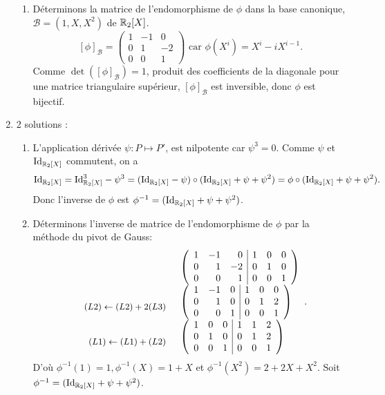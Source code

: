 \documentclass{book}
\begin{document}
\begin{enumerate}
\begin{enumerate}
\item  Déterminons la matrice de l'endomorphisme de $\phi$ dans la base canonique, $\mathcal{B}=(1,X,X^2)$ de $\mathbb{R} _2[X]$.
$$[\phi]_{\mathcal{B}}=\begin{pmatrix}1 &-1&0\\0 &1&-2\\0&0&1 \end{pmatrix}\text{ car } \phi(X^i)=X^i-i  X^{i-1}.$$
Comme $\det ([\phi]_{\mathcal{B}})=1$, produit des coefficients de la diagonale pour une matrice triangulaire supérieur,  $[\phi]_{\mathcal{B}}$ est inversible, donc $\phi$ est bijectif.  
\end{enumerate}
\item 2 solutions :
\begin{enumerate}
\item L'application dérivée $\psi:P\mapsto P'$, est nilpotente car $\psi^3=0$. Comme $\psi$ et $\mathrm{Id}_{\mathbb{R} _2[X]}$ commutent,
on a$$ \mathrm{Id}_{\mathbb{R} _2[X]}=\mathrm{Id}^3_{\mathbb{R} _2[X]}-\psi^3=(\mathrm{Id}_{\mathbb{R} _2[X]}-\psi)\circ(\mathrm{Id}_{\mathbb{R} _2[X]}+\psi+\psi^2)=\phi\circ (\mathrm{Id}_{\mathbb{R} _2[X]}+\psi+\psi^2).$$ Donc l'inverse de $\phi$ est $\phi^{-1}=(\mathrm{Id}_{\mathbb{R} _2[X]}+\psi+\psi^2)$.
\item  Déterminons l'inverse de matrice de l'endomorphisme de $\phi$ par la méthode du pivot de Gauss:
$$\begin{array}{rl}
&\left({\begin{array}{rrr|rrr}1 &-1&0&1&0&0\\0 &1&-2&0&1&0\\0&0&1&0&0&1 \end{array}}\right)\\
\begin{small}\begin{array}{r} \\(L2)\leftarrow (L2)+2(L3) \end{array}\end{small}&\left({\begin{array}{rrr|rrr}1 &-1&0&1&0&0\\0 &1&0&0&1&2\\0&0&1&0&0&1 \end{array}}\right)\\
\begin{small}\begin{array}{r} \\(L1)\leftarrow (L1)+(L2) \end{array}\end{small}&\left({\begin{array}{rrr|rrr}1 &0&0&1&1&2\\0 &1&0&0&1&2\\0&0&1&0&0&1 \end{array}}\right)
\end{array}.$$
D'où $\phi^{-1}(1)=1,\phi^{-1}(X)=1+X$ et $\phi^{-1}(X^2)=2+2X+X^2$.  Soit $\phi^{-1}=(\mathrm{Id}_{\mathbb{R} _2[X]}+\psi+\psi^2)$.
\end{enumerate}
\end{enumerate}
\end{document}
